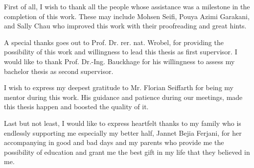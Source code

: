 First of all, I wish to thank all the people whose assistance was a milestone in the completion of
this work. These may include Mohsen Seifi, Pouya Azimi Garakani, and Sally Chau who improved this
work with their proofreading and great hints. 

A special thanks goes out to Prof. Dr. rer. nat. Wrobel, for providing the possibility of this
work and willingness to lead this thesis as first supervisor. I would like to thank Prof. Dr.-Ing.
Bauckhage for his willingness to assess my bachelor thesis as second supervisor.

I wish to express my deepest gratitude to Mr. Florian Seiffarth for being my mentor during this
work. His guidance and patience during our meetings, made this thesis happen and boosted the quality
of it.  

Last but not least, I would like to express heartfelt thanks to my family who is endlessly
supporting me especially my better half, Jannet Bejia Ferjani, for her accompanying in good and
bad days and my parents who provide me the possibility of education and grant me the best
gift in my life that they believed in me. 